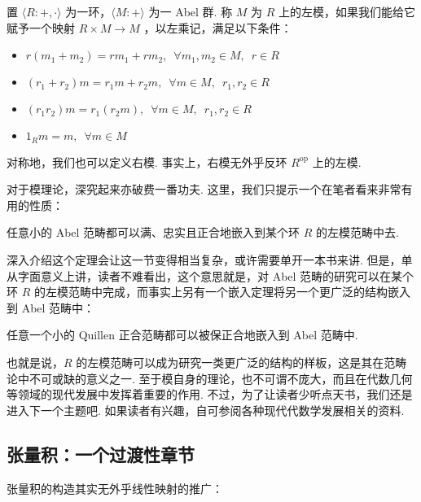 \begin{definition}
    置 $\langle R : +, \cdot \rangle$ 为一环，$\langle M : + \rangle$ 为一 Abel 群. 称 $M$ 为 $R$ 上的左模，如果我们能给它赋予一个映射 $R \times M \to M$ ，以左乘记，满足以下条件：

    \begin{itemize}
        \item $r(m_1 + m_2) = rm_1 + rm_2,\enspace \forall m_1, m_2 \in M,\enspace r \in R$
        \item $(r_1 + r_2)m = r_1m + r_2m,\enspace \forall m \in M,\enspace r_1, r_2 \in R$
        \item $(r_1r_2)m = r_1(r_2m),\enspace \forall m \in M,\enspace r_1, r_2 \in R$
        \item $1_Rm = m,\enspace \forall m \in M$
    \end{itemize}

    对称地，我们也可以定义右模. 事实上，右模无外乎反环 $R^{\mathrm{op}}$ 上的左模.
\end{definition}

对于模理论，深究起来亦破费一番功夫. 这里，我们只提示一个在笔者看来非常有用的性质：

\begin{theorem}
    任意小的 Abel 范畴都可以满、忠实且正合地嵌入到某个环 $R$ 的左模范畴中去.
\end{theorem}

深入介绍这个定理会让这一节变得相当复杂，或许需要单开一本书来讲. 但是，单从字面意义上讲，读者不难看出，这个意思就是，对 Abel 范畴的研究可以在某个环 $R$ 的左模范畴中完成，而事实上另有一个嵌入定理将另一个更广泛的结构嵌入到 Abel 范畴中：

\begin{theorem}
    任意一个小的 Quillen 正合范畴都可以被保正合地嵌入到 Abel 范畴中.
\end{theorem}

也就是说，$R$ 的左模范畴可以成为研究一类更广泛的结构的样板，这是其在范畴论中不可或缺的意义之一. 至于模自身的理论，也不可谓不庞大，而且在代数几何等领域的现代发展中发挥着重要的作用. 不过，为了让读者少听点天书，我们还是进入下一个主题吧. 如果读者有兴趣，自可参阅各种现代代数学发展相关的资料.

\subsection{张量积：一个过渡性章节}

张量积的构造其实无外乎线性映射的推广：


